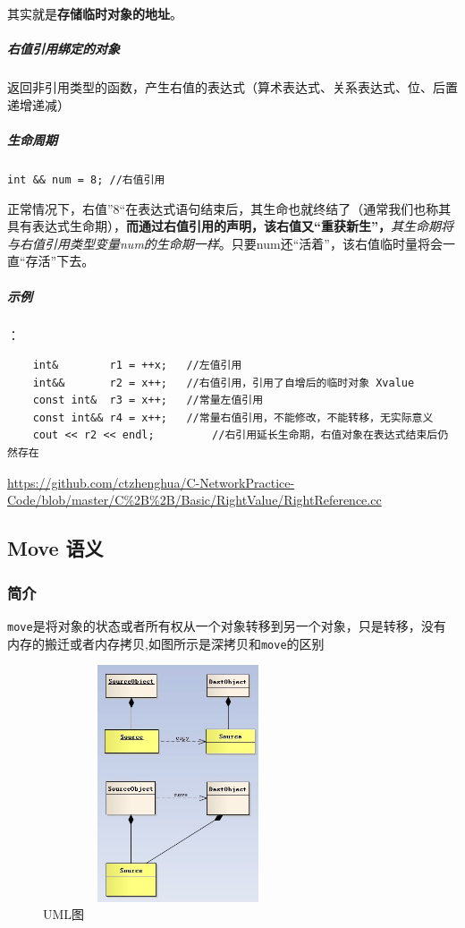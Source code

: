 \documentclass[UTF8,a4paper,12pt]{ctexbook} %
\begin{document}
				其实就是\textbf{存储临时对象的地址}。
			
			\subparagraph{右值引用绑定的对象}  返回非引用类型的函数，产生右值的表达式（算术表达式、关系表达式、位、后置递增递减）
			
			\subparagraph{生命周期}\verb|int && num = 8; //右值引用| 
			
			正常情况下，右值”8“在表达式语句结束后，其生命也就终结了（通常我们也称其具有表达式生命期），\textbf{而通过右值引用的声明，该右值又“重获新生”，}\textit{其生命期将与右值引用类型变量num的生命期一样}。只要num还“活着”，该右值临时量将会一直“存活”下去。
			
			\subparagraph{示例}：
			\begin{lstlisting}
	int&		r1 = ++x;	//左值引用
	int&&		r2 = x++;	//右值引用，引用了自增后的临时对象 Xvalue
	const int&	r3 = x++;	//常量左值引用
	const int&&	r4 = x++;	//常量右值引用，不能修改，不能转移，无实际意义
	cout << r2 << endl;			//右引用延长生命期，右值对象在表达式结束后仍然存在
			\end{lstlisting}	
			\url{https://github.com/ctzhenghua/C-NetworkPractice-Code/blob/master/C%2B%2B/Basic/RightValue/RightReference.cc}
			
		
		\subsection{Move 语义}
			\subsubsection{简介}	
				\verb|move|是将对象的状态或者所有权从一个对象转移到另一个对象，只是转移，没有内存的搬迁或者内存拷贝,如图所示是深拷贝和\verb|move|的区别
				
				\begin{figure}[h]
					\centering
					\includegraphics[angle=0,width=8cm,height=7cm]{moveANDcopy.jpg}%
					\caption{UML图}
					\label{fig:winClass}
				\end{figure}
				
\end{document}
